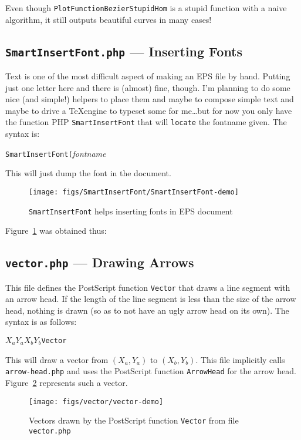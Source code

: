 \documentclass[10pt,a4paper]{scrartcl}
\newcommand\PS{PostScript}
\begin{document}
Even though \texttt{PlotFunctionBezierStupidHom} is a stupid function with a
naive algorithm, it still outputs beautiful curves in many cases!

\subsection{\texttt{SmartInsertFont.php} --- Inserting Fonts}
\label{ssec:SmartInsertFont.php}
Text is one of the most difficult aspect of making an EPS file by hand. Putting
just one letter here and there is (almost) fine, though. I'm planning to do
some nice (and simple!) helpers to place them and maybe to compose simple text
and maybe to drive a \TeX engine to typeset some for me\ldots but for now you
only have the function PHP \texttt{SmartInsertFont} that will \texttt{locate}
the fontname given. The syntax is:
\begin{center}
\texttt{SmartInsertFont\quad(}\quad\textit{fontname}\quad{)}
\end{center}
This will just dump the font in the document.
\begin{figure}[ht!]%
\centering
\texttt{[image: figs/SmartInsertFont/SmartInsertFont-demo]}%
\caption{\texttt{SmartInsertFont} helps inserting fonts in EPS document}%
\label{fig:SmartInsertFont-demo.php}%
\end{figure}

Figure~\ref{fig:SmartInsertFont-demo.php} was obtained thus:


\subsection{\texttt{vector.php} --- Drawing Arrows}
\label{ssec:vector.php}
This file defines the \PS{} function \texttt{Vector} that draws a line segment
with an arrow head. If the length of the line segment is less than the size
of the arrow head, nothing is drawn (so as to not have an ugly arrow head on its own).
The syntax is as follows:
\begin{center}
$X_a$\quad$Y_a$\quad$X_b$\quad$Y_b$\quad\texttt{Vector}
\end{center}
This will draw a vector from $(X_a,Y_a)$ to $(X_b,Y_b)$. This file implicitly calls
\texttt{arrow-head.php} and uses the \PS{} function \texttt{ArrowHead} for the arrow head.
Figure~\ref{fig:vector-demo} represents such a vector.
\begin{figure}[ht!]%
\centering
\texttt{[image: figs/vector/vector-demo]}%
\caption{Vectors drawn by the \PS{} function \texttt{Vector} from file \texttt{vector.php}}%
\label{fig:vector-demo}%
\end{figure}
\end{document}
